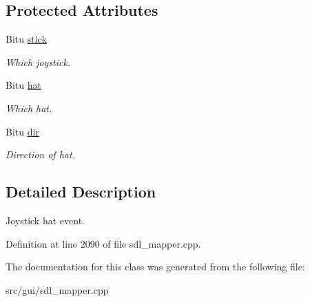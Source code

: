 \subsection*{Protected Attributes}
\begin{DoxyCompactItemize}
\item 
\hypertarget{classCJHatEvent_a53d2e407f823a8bd30a2c0d5613cb29b}{Bitu \hyperlink{classCJHatEvent_a53d2e407f823a8bd30a2c0d5613cb29b}{stick}}\label{classCJHatEvent_a53d2e407f823a8bd30a2c0d5613cb29b}

\begin{DoxyCompactList}\small\item\em Which joystick. \end{DoxyCompactList}\item 
\hypertarget{classCJHatEvent_a33cb6a20470c519958c6fd0929bcc7cd}{Bitu \hyperlink{classCJHatEvent_a33cb6a20470c519958c6fd0929bcc7cd}{hat}}\label{classCJHatEvent_a33cb6a20470c519958c6fd0929bcc7cd}

\begin{DoxyCompactList}\small\item\em Which hat. \end{DoxyCompactList}\item 
\hypertarget{classCJHatEvent_a8f7cc4b080b4f6054d6da118209683b7}{Bitu \hyperlink{classCJHatEvent_a8f7cc4b080b4f6054d6da118209683b7}{dir}}\label{classCJHatEvent_a8f7cc4b080b4f6054d6da118209683b7}

\begin{DoxyCompactList}\small\item\em Direction of hat. \end{DoxyCompactList}\end{DoxyCompactItemize}


\subsection{Detailed Description}
Joystick hat event. 

Definition at line 2090 of file sdl\-\_\-mapper.\-cpp.



The documentation for this class was generated from the following file\-:\begin{DoxyCompactItemize}
\item 
src/gui/sdl\-\_\-mapper.\-cpp\end{DoxyCompactItemize}

